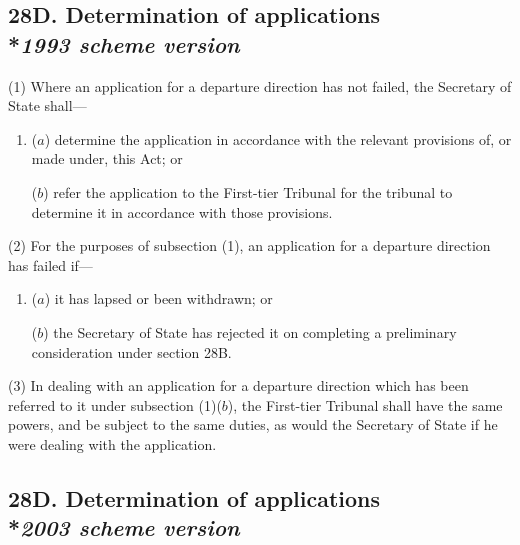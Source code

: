 \documentclass[12pt,a4paper]{article}
\begin{document}
\subsection[28D. Determination of applications --- \emph{1993 scheme version}]{28D. Determination of applications\\*\emph{1993 scheme version}}

(1) Where an application for a departure direction has not failed, the Secretary of State shall—
\begin{enumerate}\item[]
($a$) determine the application in accordance with the relevant provisions of, or made under, this Act; or

($b$) refer the application to 
the First-tier Tribunal  %
for the tribunal to determine it in accordance with those provisions.
\end{enumerate}

(2) For the purposes of subsection (1), an application for a departure direction has failed if—
\begin{enumerate}\item[]
($a$) it has lapsed or been withdrawn; or

($b$) the Secretary of State has rejected it on completing a preliminary consideration under section 28B.
\end{enumerate}

(3) In dealing with an application for a departure direction which has been referred to it under subsection (1)($b$), 
the First-tier Tribunal  %
shall have the same powers, and be subject to the same duties, as would the Secretary of State if he were dealing with the application.


\subsection[28D. Determination of applications --- \emph{2003 scheme version}]{28D. Determination of applications\\*\emph{2003 scheme version}}
\end{document}
